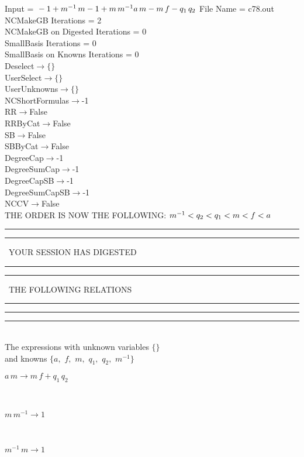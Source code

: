 \documentclass[rep10,leqno]{report}
\begin{document}
\normalsize
\baselineskip=12pt
\noindent
Input = 
$
\\-1 + m^{ -1 }\,
 m\\
-1 + m\,
 m^{ -1 }\\
a\,
 m - m\,
 f - q_{1}\,
 q_{2}\\
$
File Name = c78.out\\
NCMakeGB Iterations = 2\\
NCMakeGB on Digested Iterations = 0\\
SmallBasis Iterations = 0\\
SmallBasis on Knowns Iterations = 0\\
Deselect$\rightarrow \{\}$\\
UserSelect$\rightarrow \{\}$\\
UserUnknowns$\rightarrow \{\}$\\
NCShortFormulas$\rightarrow$-1\\
RR$\rightarrow $False\\
RRByCat$\rightarrow $False\\
SB$\rightarrow $False\\
SBByCat$\rightarrow $False\\
DegreeCap$\rightarrow $-1\\
DegreeSumCap$\rightarrow $-1\\
DegreeCapSB$\rightarrow $-1\\
DegreeSumCapSB$\rightarrow $-1\\
NCCV$\rightarrow $False\\
THE ORDER IS NOW THE FOLLOWING:\hfil\break
$
m^{ -1 }<q_{2}<q_{1}<m<f<a\\
$
\rule[2pt]{6in}{4pt}\hfil\break
\rule[2pt]{1.879in}{4pt}
\ YOUR SESSION HAS DIGESTED\ 
\rule[2pt]{1.879in}{4pt}\hfil\break
\rule[2pt]{1.923in}{4pt}
\ THE FOLLOWING RELATIONS\ 
\rule[2pt]{1.923in}{4pt}\hfil\break
\rule[2pt]{6in}{4pt}\hfil\break
\rule[3pt]{6in}{.7pt}\\
The expressions with unknown variables $\{\}$\\
and knowns $\{a,
$ $
f,
$ $
m,
$ $
q_{1},
$ $
q_{2},
$ $
m^{ -1 }\}$\smallskip\\
\begin{minipage}{6in}
$
a\,
 m\rightarrow m\,
 f + q_{1}\,
 q_{2}
$
\end{minipage}\medskip \\
\begin{minipage}{6in}
$
m\,
 m^{ -1 }\rightarrow 1
$
\end{minipage}\medskip \\
\begin{minipage}{6in}
$
m^{ -1 }\,
 m\rightarrow 1
$
\end{minipage}\medskip \\
\end{document}

